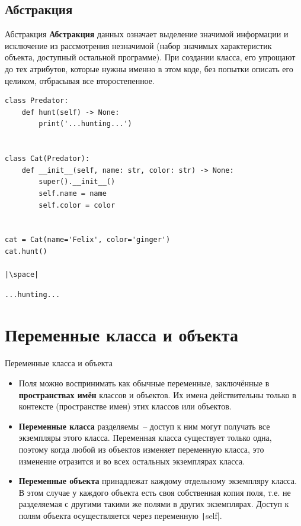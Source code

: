 \documentclass[aspectratio=169, mathserif]{beamer}	%
\begin{document}
\subsection{Абстракция}
\begin{frame}[fragile]{Абстракция}
\scriptsize
\textcolor{tpugreen}{\textbf{Абстракция}} данных означает выделение значимой информации и исключение из рассмотрения незначимой (набор значимых характеристик объекта, доступный остальной программе).
\vfill
При создании класса, его упрощают до тех атрибутов, которые нужны именно в этом коде, без попытки описать его целиком, отбрасывая все второстепенное.
\vfill
\begin{verbatim}
class Predator:
    def hunt(self) -> None:
        print('...hunting...')


class Cat(Predator):
    def __init__(self, name: str, color: str) -> None:
        super().__init__()
        self.name = name
        self.color = color


cat = Cat(name='Felix', color='ginger')
cat.hunt()

|\space|
\end{verbatim}
\begin{verbatim}
...hunting...
\end{verbatim}
\vfill
\end{frame}

\section{Переменные класса и объекта}
\sectionframe

\begin{frame}[fragile]{Переменные класса и объекта}
\scriptsize
\begin{itemize}
	\item Поля можно воспринимать как обычные переменные, заключённые в \textbf{пространствах имён} классов и объектов. Их имена действительны только в контексте (пространстве имен) этих классов или объектов.

	\item \textcolor{extraorange}{\textbf{Переменные класса}} разделяемы~-- доступ к ним могут получать все экземпляры этого класса. Переменная класса существует только одна, поэтому когда любой из объектов изменяет переменную класса, это изменение отразится и во всех остальных экземплярах класса.

	\item \textcolor{extraorange}{\textbf{Переменные объекта}} принадлежат каждому отдельному экземпляру класса. В этом случае у каждого объекта есть своя собственная копия поля, т.е. не разделяемая с другими такими же полями в других экземплярах. Доступ к полям объекта осуществляется через переменную \texttt|self|.
\end{itemize}
\vfill
\end{frame}
\end{document}
